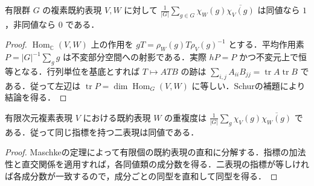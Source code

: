 \begin{prop}[指標の直交関係]
有限群 $G$ の複素既約表現 $V,W$ に対して $\frac1{|G|}\sum_{g\in G}\chi_W(g)\overline{\chi_V(g)}$ は同値なら $1$，非同値なら $0$ である．
\end{prop}
\begin{proof}
$\operatorname{Hom}_{\mathbb C}(V,W)$ 上の作用を $gT=\rho_W(g)T\rho_V(g)^{-1}$ とする．平均作用素 $P=|G|^{-1}\sum_g g$ は不変部分空間への射影である．実際 $hP=P$ かつ不変元上で恒等となる．行列単位を基底とすれば $T\mapsto ATB$ の跡は $\sum_{i,j}A_{ii}B_{jj}=\operatorname{tr}A\operatorname{tr}B$ である．従って左辺は $\operatorname{tr}P=\dim\operatorname{Hom}_G(V,W)$ に等しい．Schurの補題により結論を得る．
\end{proof}
\begin{prop}[既約成分の重複度]
有限次元複素表現 $V$ における既約表現 $W$ の重複度は $\frac1{|G|}\sum_g\chi_V(g)\overline{\chi_W(g)}$ である．従って同じ指標を持つ二表現は同値である．
\end{prop}
\begin{proof}
Maschkeの定理によって有限個の既約表現の直和に分解する．指標の加法性と直交関係を適用すれば，各同値類の成分数を得る．二表現の指標が等しければ各成分数が一致するので，成分ごとの同型を直和して同型を得る．
\end{proof}
